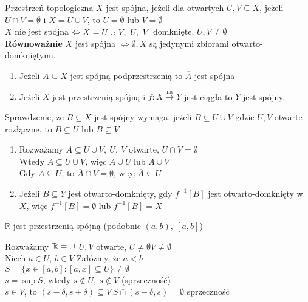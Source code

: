 \begin{df} 
    Przestrzeń topologiczna $X$ jest spójna, jeżeli dla otwartych $U, V \subseteq X$, 
    jeżeli $U \cap V = \emptyset$ i $X = U \cup V$, to $U = \emptyset$ lub $V = \emptyset$
    \\$X$ nie jest spójna $\Leftrightarrow X = U\cup\mkern-9mu\cdot\mkern5mu V,\ U,\ V$ 
    domknięte, $U,V \neq \emptyset$\\
    \textbf{Równoważnie}  $X$ jest spójna $\Leftrightarrow \emptyset, X$ są jedynymi 
    zbiorami otwarto-domkniętymi.
\end{df} 
\begin{tw} \hfill 
    \begin{enumerate}[(1)]
        \item Jeżeli $A \subseteq X$ jest spójną podprzestrzenią to $\overline A$ jest
            spójna 
        \item Jeżeli $X$ jest przestrzenią spójną i $f: X \xrightarrow{\text{na}} Y$ 
            jest ciągła to $Y$ jest spójny.
    \end{enumerate} 
\end{tw} 
\begin{uw} 
    Sprawdzenie, że $B \subseteq X$ jest spójny wymaga, jeżeli $B \subseteq U \cup V$ 
    gdzie $U, V$ otwarte rozłączne, to $B \subseteq U$ lub $B \subseteq V$
\end{uw} 
\begin{dd} \hfill
    \begin{enumerate}[(1)] 
        \item Rozważamy $\overline A \subseteq U \cup V,\ U,\ V $ otwarte, $U \cap V = 
            \emptyset$ \\ 
            Wtedy $A \subseteq U \cup V$, więc $A \cup U$ lub $A \cup V$ \\ 
            Gdy $A \subseteq U$, to $\overline A \cap V = \emptyset$, więc $\overline A 
            \subseteq U$
        \item Jeżeli $B \subseteq Y$ jest otwarto-domknięty, 
            gdy $f^{-1}[B]$ jest otwarto-domknięty w $X$, więc $f^{-1} [B] = \emptyset$ 
            lub $f^{-1} [B] = X$
    \end{enumerate}
\end{dd} 
\begin{tw} 
    $\mathbb{R}$ jest przestrzenią spójną (podobnie $(a,b),\ [a,b]$)
\end{tw} 
\begin{dd} 
    Rozważamy $\mathbb{R} = \cup\mkern-9mu\cdot\mkern5mu$ $U,V$ otwarte, $U \neq \emptyset
    V \neq \emptyset$ \\ 
    Niech $a \in U,\ b \in V$ Załóżmy, że $a < b$ \\ 
    $S = \{ x \in [a,b]: [a,x] \subseteq U \} \neq \emptyset$ \\ 
    $s = \sup S$, wtedy $s \notin U,\ s \notin V$ (sprzeczność) \\ 
    $s \in V$, to $(s-\delta,s+\delta) \subseteq V \ S \cap (s-\delta,s) = \emptyset$
    sprzeczność
\end{dd} 

